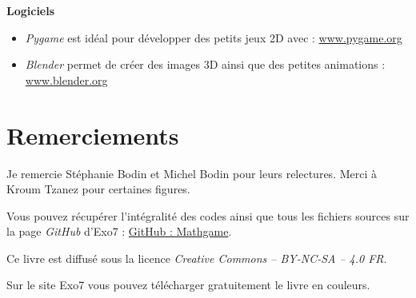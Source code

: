 \smallskip

\textbf{Logiciels}


\begin{itemize}
	\item \emph{Pygame} est idéal pour développer des petits jeux 2D avec \Python{} : \href{https://www.pygame.org/}{www.pygame.org}	
	\item \emph{Blender} permet de créer des images 3D ainsi que des petites animations : \href{https://www.blender.org/}{www.blender.org}
\end{itemize}



\section*{Remerciements}

Je remercie Stéphanie Bodin et Michel Bodin pour leurs relectures. Merci à Kroum Tzanez pour certaines figures.






\bigskip

\begin{center}
Vous pouvez récupérer l'intégralité des codes \Python{} ainsi que tous les fichiers sources sur la page \emph{GitHub} d'Exo7 :
\href{https://github.com/exo7math/mathgame-exo7}{\og{}GitHub : Mathgame\fg{}}.


\end{center}


\vspace*{\fill}

\bigskip 

\begin{center}
\end{center}



\begin{center}
Ce livre est diffusé sous la licence \emph{Creative Commons -- BY-NC-SA -- 4.0 FR}.

Sur le site Exo7 vous pouvez télécharger gratuitement le livre en couleurs.
\end{center}




\printindex
{}


